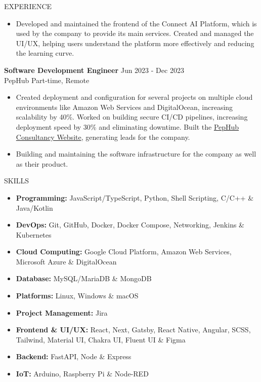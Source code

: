 \documentclass{resume}
\begin{document}
\begin{rSection}{EXPERIENCE}
  \begin{itemize}
    \item{Developed and maintained the frontend of the Connect AI Platform, which is used by the company to provide its main services. Created and managed the UI/UX, helping users understand the platform more effectively and reducing the learning curve.}
  \end{itemize}
  \vspace{-0.4em}
  {\bf Software Development Engineer} \hfill {Jun 2023 - Dec 2023}\\
  PepHub \hfill {Part-time, Remote}
  \vspace{-0.4em}
  \begin{itemize}
    \item{Created deployment and configuration for several projects on multiple cloud environments like Amazon Web Services and DigitalOcean, increasing scalability by 40\%. Worked on building secure CI/CD pipelines, increasing deployment speed by 30\% and eliminating downtime. Built the {\href{https://consultancy.pephub.tech}{PepHub Consultancy Website}}, generating leads for the company.}
  \end{itemize}
  \vspace{-0.4em}
  \begin{itemize}
    \item{Building and maintaining the software infrastructure for the company as well as their product.}
  \end{itemize}
\end{rSection}
\vspace{-0.4em}
\begin{rSection}{SKILLS}
  \begin{itemize}
    \item \textbf{Programming:} JavaScript/TypeScript, Python, Shell Scripting, C/C++ \& Java/Kotlin
    \item \textbf{DevOps:} Git, GitHub, Docker, Docker Compose, Networking, Jenkins \& Kubernetes
    \item \textbf{Cloud Computing:} Google Cloud Platform, Amazon Web Services, Microsoft Azure \& DigitalOcean
    \item \textbf{Database:} MySQL/MariaDB \& MongoDB
    \item \textbf{Platforms:} Linux, Windows \& macOS
    \item \textbf{Project Management:} Jira
    \item \textbf{Frontend \& UI/UX:} React, Next, Gatsby, React Native, Angular, SCSS, Tailwind, Material UI, Chakra UI, Fluent UI \& Figma
    \item \textbf{Backend:} FastAPI, Node \& Express
    \item \textbf{IoT:} Arduino, Raspberry Pi \& Node-RED
  \end{itemize}
\end{rSection}
\end{document}
